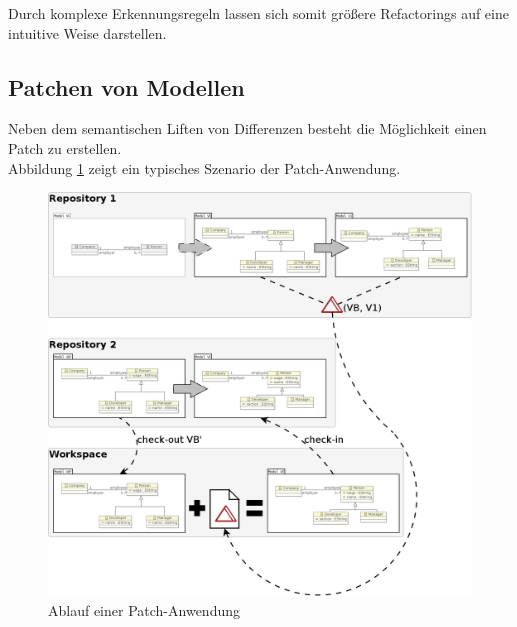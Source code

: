 \documentclass[a4paper]{scrartcl}
\begin{document}
Durch komplexe Erkennungsregeln lassen sich somit größere Refactorings auf eine intuitive Weise darstellen.\\

\newpage

\subsection{Patchen von Modellen}
Neben dem semantischen Liften von Differenzen besteht die Möglichkeit einen Patch zu erstellen.\\
Abbildung \ref{silift-tutorial_patching_classdiagrams} zeigt ein typisches Szenario der Patch-Anwendung. 

\begin{figure}[H]
\centering
\includegraphics[width=\textwidth]{graphics/silift-tutorial_patching_classdiagrams.png}
\caption{Ablauf einer Patch-Anwendung}
\label{silift-tutorial_patching_classdiagrams}
\end{figure}
\end{document}
